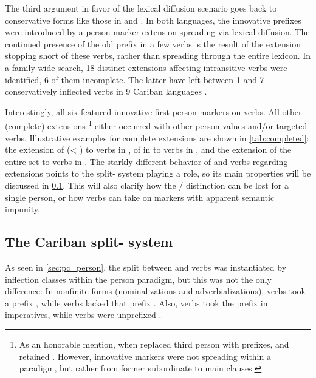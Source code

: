 The third argument in favor of the lexical diffusion scenario goes back to conservative forms like those in \hixka and \trio.
In both languages, the innovative  prefixes were introduced by a person marker extension spreading via lexical diffusion.
The continued presence of the old  prefix in a few verbs is the result of the extension stopping short of these verbs, rather than spreading through the entire  lexicon.
In a family-wide search, 18 distinct extensions affecting intransitive verbs were identified, 6 of them incomplete.
The latter have left between 1 and 7 conservatively inflected verbs in 9 Cariban languages .

Interestingly, all six featured innovative first person markers on  verbs.
All other (complete) extensions%
\footnote{As an honorable mention, when \ikpeng replaced third person \setone with \settwo prefixes,   and   retained  \parencite[12]{matter2019arara}.
	However, innovative markers were not spreading within a paradigm, but rather from former subordinate to main clauses.} either occurred with other person values and/or targeted  verbs.
Illustrative examples for complete extensions are shown in \cref{tab:completed}: the extension of   (< ) to  verbs in \apalai {}, of   in to  verbs in \panare {}, and the extension of the entire  set to  verbs in \waimiri {}. %
The starkly different behavior of  and  verbs regarding extensions points to the split- system playing a role, so its main properties will be discussed in \cref{sec:split}.
This will also clarify how the / distinction can be lost for a single person, or how  verbs can take on  markers with apparent semantic impunity.



\subsection{The Cariban split- system}
\label{sec:split}
As seen in \cref{sec:pc_person}, the split between  and  verbs was instantiated by inflection classes within the \PC \setone person paradigm, but this was not the only difference:
In nonfinite forms (nominalizations and adverbializations),  verbs took a prefix , while  verbs lacked that prefix \parencites[89, 141--142]{gildea1998}[208]{meira2000split}.
Also,  verbs took the  prefix  in imperatives, while  verbs were unprefixed \parencites[89]{gildea1998}[208]{meira2000split}.

